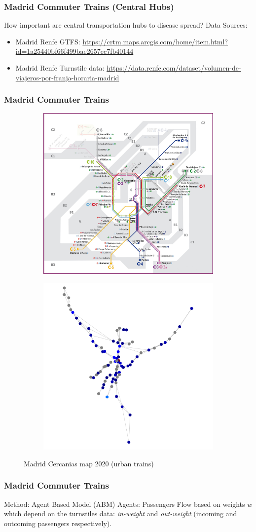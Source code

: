 \documentclass{beamer}
\begin{document}
\begin{frame}
\frametitle{Madrid Commuter Trains (Central Hubs)}
How important are central transportation hubs to disease spread?\linebreak
\linebreak
Data Sources:
\begin{itemize}
	\item Madrid Renfe GTFS: \url{https://crtm.maps.arcgis.com/home/item.html?id=1a25440bf66f499bae2657ec7fb40144}
	\item Madrid Renfe Turnstile data: \url{https://data.renfe.com/dataset/volumen-de-viajeros-por-franja-horaria-madrid}
\end{itemize}
\end{frame}
\begin{frame}
\frametitle{Madrid Commuter Trains}
\begin{figure}
	\centering
	\begin{subfigure}
		\centering
		\includegraphics[width=.4\linewidth]{Scratch_Visuals/madrid-cercanias-map-fix.png}
	\end{subfigure}%
	\begin{subfigure}
		\centering
		\includegraphics[width=.4\linewidth]{Scratch_Visuals/madrid-cercanias-map-py.png}
	\end{subfigure}
	\caption{Madrid Cercanias map 2020 (urban trains)}
\end{figure}
\end{frame}
\begin{frame}
\frametitle{Madrid Commuter Trains}
Method: Agent Based Model (ABM)\linebreak
Agents: Passengers\linebreak
Flow based on weights $w$ which depend on the turnstiles data: \textit{in-weight} and \textit{out-weight} (incoming and outcoming passengers respectively).
\end{frame}
\end{document}
